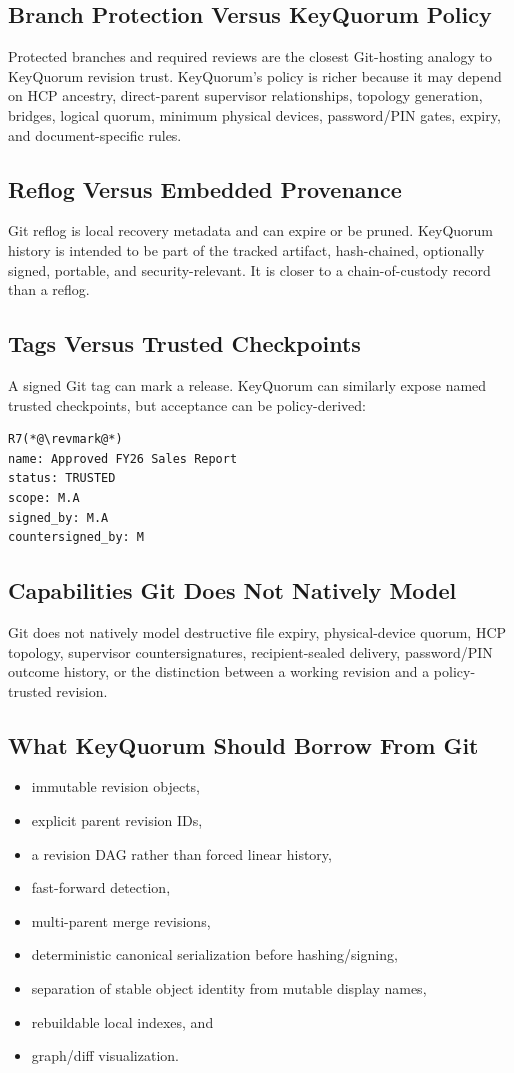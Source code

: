 \documentclass[11pt]{article}
\begin{document}
\subsection{Branch Protection Versus KeyQuorum Policy}
Protected branches and required reviews are the closest Git-hosting analogy to KeyQuorum revision trust. KeyQuorum's policy is richer because it may depend on HCP ancestry, direct-parent supervisor relationships, topology generation, bridges, logical quorum, minimum physical devices, password/PIN gates, expiry, and document-specific rules.

\subsection{Reflog Versus Embedded Provenance}
Git reflog is local recovery metadata and can expire or be pruned. KeyQuorum history is intended to be part of the tracked artifact, hash-chained, optionally signed, portable, and security-relevant. It is closer to a chain-of-custody record than a reflog.

\subsection{Tags Versus Trusted Checkpoints}
A signed Git tag can mark a release. KeyQuorum can similarly expose named trusted checkpoints, but acceptance can be policy-derived:
\begin{lstlisting}
R7(*@\revmark@*)
name: Approved FY26 Sales Report
status: TRUSTED
scope: M.A
signed_by: M.A
countersigned_by: M
\end{lstlisting}

\subsection{Capabilities Git Does Not Natively Model}
Git does not natively model destructive file expiry, physical-device quorum, HCP topology, supervisor countersignatures, recipient-sealed delivery, password/PIN outcome history, or the distinction between a working revision and a policy-trusted revision.

\subsection{What KeyQuorum Should Borrow From Git}
\begin{itemize}[leftmargin=1.5em]
  \item immutable revision objects,
  \item explicit parent revision IDs,
  \item a revision DAG rather than forced linear history,
  \item fast-forward detection,
  \item multi-parent merge revisions,
  \item deterministic canonical serialization before hashing/signing,
  \item separation of stable object identity from mutable display names,
  \item rebuildable local indexes, and
  \item graph/diff visualization.
\end{itemize}
\end{document}
